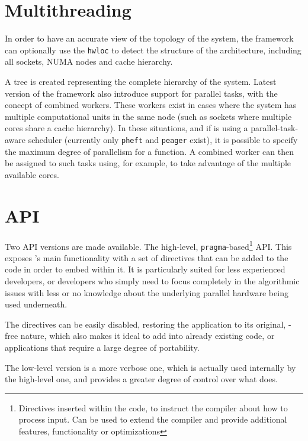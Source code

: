 \documentclass[main.tex]{subfiles}
\begin{document}

\section{Multithreading} \label{section:starpu_multithreading}

In order to have an accurate view of the topology of the system, the framework can optionally use the \texttt{hwloc} \cite{broquedis2010hwloc} to detect the structure of the architecture, including all \cpu sockets, \acs{NUMA} nodes and cache hierarchy.

A tree is created representing the complete hierarchy of the system. Latest version of the framework also introduce support for parallel tasks, with the concept of combined workers. These workers exist in cases where the system has multiple computational units in the same node (such as \cpu sockets where multiple cores share a cache hierarchy). In these situations, and if \starpu is using a parallel-task-aware scheduler (currently only \texttt{pheft} and \texttt{peager} exist), it is possible to specify the maximum degree of parallelism for a function. A combined worker can then be assigned to such tasks using, for example, \openmp to take advantage of the multiple available cores.

\section{API} \label{section:starpu_api}

Two API versions are made available. The high-level, \texttt{pragma}-based\footnote{Directives inserted within the code, to instruct the compiler about how to process input. Can be used to extend the compiler and provide additional features, functionality or optimizations} API. This exposes \starpu's main functionality with a set of directives that can be added to the code in order to embed \starpu within it. It is particularly suited for less experienced developers, or developers who simply need to focus completely in the algorithmic issues with less or no knowledge about the underlying parallel hardware being used underneath.

The directives can be easily disabled, restoring the application to its original, \starpu-free nature, which also makes it ideal to add \starpu into already existing code, or applications that require a large degree of portability.

The low-level version is a more verbose one, which is actually used internally by the high-level one, and provides a greater degree of control over what \starpu does.
\end{document}
